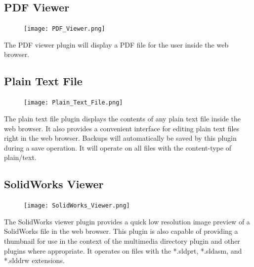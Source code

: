 \documentclass[10pt]{article}
\begin{document}
\clearpage
\begingroup
\setlength\intextsep{0pt}
\subsection{PDF Viewer}
\begin{figure}
		\texttt{[image: PDF\_Viewer.png]}
\end{figure}
The PDF viewer plugin will display a PDF file for the user inside the web browser.

\endgroup

\hfill \break
\hfill \break
\hfill \break
\hfill \break
\hfill \break
\hfill \break
\hfill \break
\hfill \break
\hfill \break
\hfill \break
\hfill \break
\hfill \break
\hfill \break
\hfill \break

\begingroup
\setlength\intextsep{0pt}
\subsection{Plain Text File}
\begin{figure}
		\texttt{[image: Plain\_Text\_File.png]}
\end{figure}
The plain text file plugin displays the contents of any plain text file inside the web browser.  It also provides a convenient interface for editing plain text files right in the web browser.  Backups will automatically be saved by this plugin during a save operation.  It will operate on all files with the content-type of plain/text.

\endgroup

\hfill \break
\hfill \break
\hfill \break
\hfill \break
\hfill \break

\begingroup
\setlength\intextsep{0pt}
\subsection{SolidWorks Viewer}
\begin{figure}
		\texttt{[image: SolidWorks\_Viewer.png]}
\end{figure}
The SolidWorks viewer plugin provides a quick low resolution image preview of a SolidWorks file in the web browser.  This plugin is also capable of providing a thumbnail for use in the context of the multimedia directory plugin and other plugins where appropriate.  It operates on files with the *.sldprt, *.sldasm, and *.slddrw extensions.

\endgroup
\end{document}
